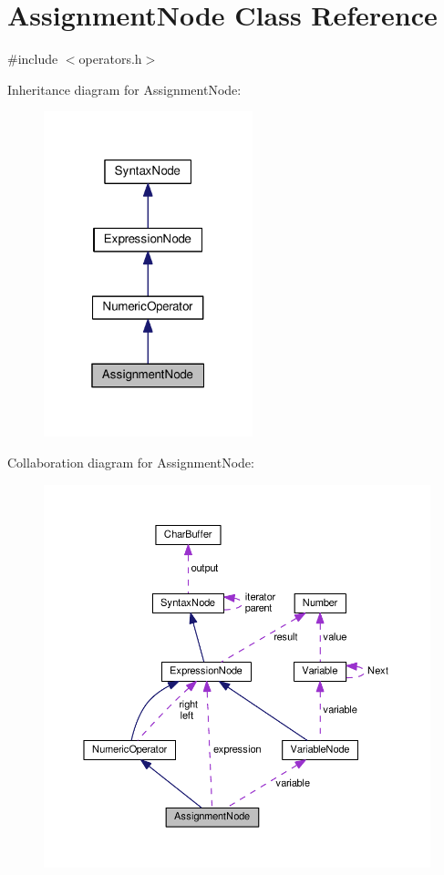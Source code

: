 \hypertarget{classAssignmentNode}{}\section{Assignment\+Node Class Reference}
\label{classAssignmentNode}


{\ttfamily \#include $<$operators.\+h$>$}



Inheritance diagram for Assignment\+Node\+:\nopagebreak
\begin{figure}[H]
\begin{center}
\leavevmode
\includegraphics[width=172pt]{classAssignmentNode__inherit__graph}
\end{center}
\end{figure}


Collaboration diagram for Assignment\+Node\+:\nopagebreak
\begin{figure}[H]
\begin{center}
\leavevmode
\includegraphics[width=350pt]{classAssignmentNode__coll__graph}
\end{center}
\end{figure}
